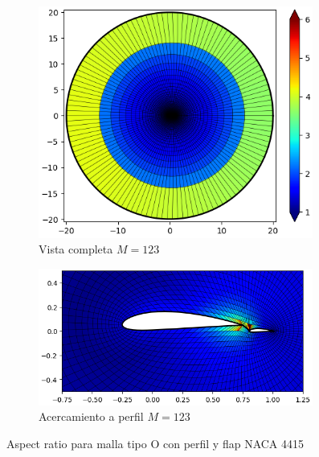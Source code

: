 \documentclass[letterpaper, openright, 12pt]{book}
\begin{document}
\begin{figure}[htbp!]
\begin{subfigure}[c]{0.48\textwidth}
            \includegraphics[keepaspectratio, width=0.99\textwidth]
                {./img/naca4415_flap_m_123_aspect_far}
            \caption{Vista completa $M = 123$}
            \label{fig:naca4415_flap_m_123_aspect_far}
        \end{subfigure}
        \hfill
        \begin{subfigure}[c]{0.48\textwidth}
            \includegraphics[keepaspectratio, width=0.99\textwidth]
                {./img/naca4415_flap_m_123_aspect_close}
            \caption{Acercamiento a perfil $M = 123$}
        \end{subfigure}
        \caption{Aspect ratio para malla tipo O con perfil y flap NACA 4415}
    \end{figure}
\end{document}
